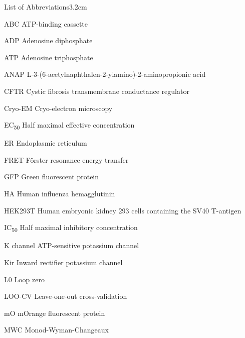 \graphicspath{{figures/appendix/}}

\begin{mclistof}{List of Abbreviations}{3.2cm}

\item[ABC] ATP-binding cassette

\item[ADP] Adenosine diphosphate

\item[ATP] Adenosine triphosphate

\item[ANAP] L-3-(6-acetylnaphthalen-2-ylamino)-2-aminopropionic acid

\item[CFTR] Cystic fibrosis transmembrane conductance regulator

\item[Cryo-EM] Cryo-electron microscopy

\item[EC\textsubscript{50}] Half maximal effective concentration

\item[ER] Endoplasmic reticulum

\item[FRET] F\"{o}rster resonance energy transfer

\item[GFP] Green fluorescent protein

\item[HA] Human influenza hemagglutinin

\item[HEK293T] Human embryonic kidney 293 cells containing the SV40 T-antigen

\item[IC\textsubscript{50}] Half maximal inhibitory concentration

\item[K\ATP{} channel] ATP-sensitive potassium channel

\item[Kir] Inward rectifier potassium channel

\item[L0] Loop zero

\item[LOO-CV] Leave-one-out cross-validation

\item[mO] mOrange fluorescent protein

\item[MWC] Monod-Wyman-Changeaux


\end{mclistof}
